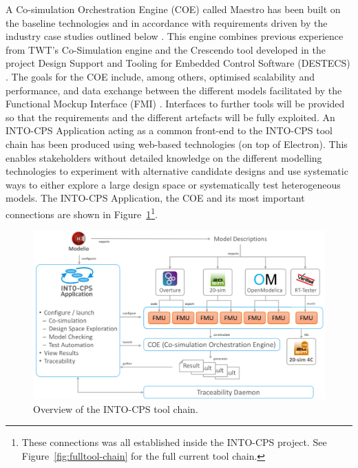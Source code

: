 A Co-simulation Orchestration Engine (COE) called Maestro has been built on the baseline technologies and in accordance with requirements driven by the industry case studies outlined below \cite{Thule&17}. This engine combines previous experience from TWT's Co-Simulation engine and the Crescendo tool developed in the project Design Support and Tooling for Embedded Control Software (DESTECS) \cite{Broenink&10}. The goals for the COE include, among others, optimised scalability and performance, and data exchange between the different models facilitated by the Functional Mockup Interface (FMI) \cite{FMIStandard2.0}. Interfaces to further tools will be provided so that the requirements and the different artefacts will be fully exploited. An INTO-CPS Application acting as a common front-end to the INTO-CPS tool chain has been produced using web-based technologies (on top of Electron). This enables stakeholders without detailed knowledge on the different modelling technologies to experiment with alternative candidate designs and use systematic ways to either explore a large design space or systematically test heterogeneous models. The INTO-CPS Application, the COE and its most important connections are shown in Figure~\ref{fig:toolchain}\footnote{These connections was all established inside the INTO-CPS project. See Figure~\ref{fig:fulltool-chain} for the full current tool chain.}.

\begin{figure}[ht]
\centering
\includegraphics[width=\textwidth]{./figures/toolchain}
\caption{Overview of the INTO-CPS tool chain.}
\label{fig:toolchain}
\end{figure}

